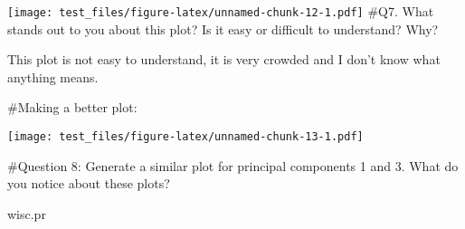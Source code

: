 \documentclass[
]{article}
\newenvironment{Shaded}{\begin{snugshade}}{\end{snugshade}}
\newcommand{\AttributeTok}[1]{\textcolor[rgb]{0.77,0.63,0.00}{#1}}
\newcommand{\CommentTok}[1]{\textcolor[rgb]{0.56,0.35,0.01}{\textit{#1}}}
\newcommand{\DecValTok}[1]{\textcolor[rgb]{0.00,0.00,0.81}{#1}}
\newcommand{\FunctionTok}[1]{\textcolor[rgb]{0.00,0.00,0.00}{#1}}
\newcommand{\NormalTok}[1]{#1}
\newcommand{\SpecialCharTok}[1]{\textcolor[rgb]{0.00,0.00,0.00}{#1}}
\newcommand{\StringTok}[1]{\textcolor[rgb]{0.31,0.60,0.02}{#1}}
\begin{document}
\texttt{[image: test\_files/figure-latex/unnamed-chunk-12-1.pdf]} \#Q7.
What stands out to you about this plot? Is it easy or difficult to
understand? Why?

This plot is not easy to understand, it is very crowded and I don't know
what anything means.

\#Making a better plot:

\begin{Shaded}
\end{Shaded}

\texttt{[image: test\_files/figure-latex/unnamed-chunk-13-1.pdf]}

\#Question 8: Generate a similar plot for principal components 1 and 3.
What do you notice about these plots?

\begin{Shaded}
\begin{Highlighting}[]
\NormalTok{wisc.pr}
\end{Highlighting}
\end{Shaded}
\end{document}

